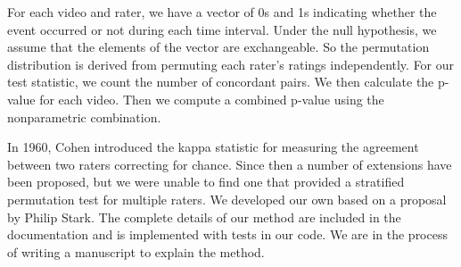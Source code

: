 For each video and rater, we have a vector of 0s and 1s indicating whether the
event occurred or not during each time interval.  Under the null hypothesis, we
assume that the elements of the vector are exchangeable.  So the permutation
distribution is derived from permuting each rater's ratings independently.  For
our test statistic, we count the number of concordant pairs.  We then calculate
the p-value for each video.  Then we compute a combined p-value using the
nonparametric combination.

In 1960, Cohen \cite{cohen1960} introduced the kappa statistic for measuring
the agreement between two raters correcting for chance.  Since then a number of
extensions have been proposed, but we were unable to find one that provided a
stratified permutation test for multiple raters. We developed our own based
on a proposal by Philip Stark. The complete details of our method are included
in the documentation and is implemented with tests in our code.  We are in the
process of writing a manuscript to explain the method.


%


